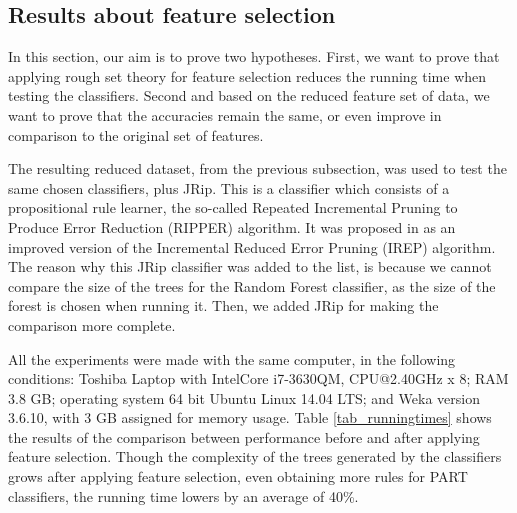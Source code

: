 \documentclass{llncs}
\begin{document}
\subsection{Results about feature selection}
\label{subsec:RSTresults}

In this section, our aim is to prove two hypotheses. First, we want to
prove that applying rough set theory for feature selection reduces the
running time when testing the classifiers. Second and based on the
reduced feature set of data, we want to prove that the accuracies
remain the same, or even improve in comparison to the original set of
features.

The resulting reduced dataset, from the previous subsection, was used to test the same chosen classifiers, plus JRip. This is a classifier which consists of a propositional rule learner, the so-called Repeated Incremental Pruning to Produce Error Reduction (RIPPER) algorithm. It was proposed in \cite{cohen1995fast} as an improved version of the Incremental Reduced Error Pruning (IREP) algorithm. The reason why this JRip classifier was added to the list, is because we cannot compare the size of the trees for the Random Forest classifier, as the size of the forest is chosen when running it. Then, we added JRip for making the comparison more complete.

All the experiments were made with the same computer, in the following
conditions: Toshiba Laptop with Intel\texttrademark  Core i7-3630QM,
CPU@2.40GHz x 8; RAM 3.8 GB; operating system 64 bit Ubuntu Linux 14.04 LTS; and Weka version 3.6.10, with 3 GB assigned for memory
usage. Table \ref{tab_runningtimes} shows the results of the
comparison between performance before and after applying feature
selection. Though the complexity of the trees generated by the
classifiers grows after applying feature selection, even obtaining
more rules for PART classifiers, the running time lowers by an average
of 40\%.
\end{document}
